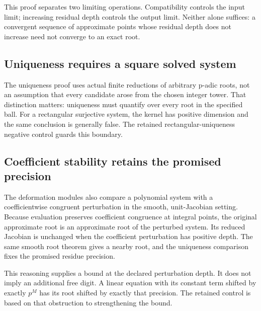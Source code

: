 This proof separates two limiting operations. Compatibility controls the input limit; increasing residual depth controls the output limit. Neither alone suffices: a convergent sequence of approximate points whose residual depth does not increase need not converge to an exact root.

\subsection{Uniqueness requires a square solved system}

The uniqueness proof uses actual finite reductions of arbitrary p-adic roots, not an assumption that every candidate arose from the chosen integer tower. That distinction matters: uniqueness must quantify over every root in the specified ball. For a rectangular surjective system, the kernel has positive dimension and the same conclusion is generally false. The retained rectangular-uniqueness negative control guards this boundary.

\subsection{Coefficient stability retains the promised precision}
The deformation modules also compare a polynomial system with a coefficientwise congruent perturbation in the smooth, unit-Jacobian setting. Because evaluation preserves coefficient congruence at integral points, the original approximate root is an approximate root of the perturbed system. Its reduced Jacobian is unchanged when the coefficient perturbation has positive depth. The same smooth root theorem gives a nearby root, and the uniqueness comparison fixes the promised residue precision.

This reasoning supplies a bound at the declared perturbation depth. It does not imply an additional free digit. A linear equation with its constant term shifted by exactly $p^M$ has its root shifted by exactly that precision. The retained  control is based on that obstruction to strengthening the bound.
